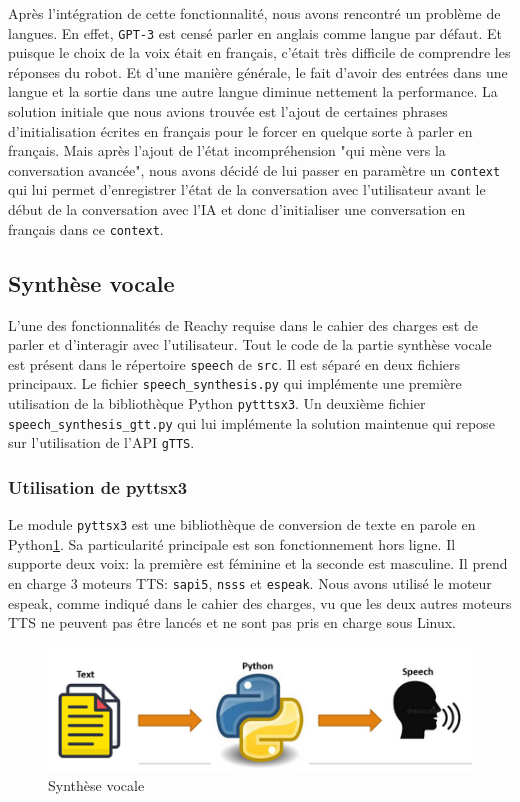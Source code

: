 \documentclass[a4paper,french]{article}
\begin{document}
Après l'intégration de cette fonctionnalité, nous avons rencontré un problème de langues. En effet, \texttt{GPT-3} est censé parler en anglais comme langue par défaut. Et puisque le choix de la voix était en français, c'était très difficile de comprendre les réponses du robot. Et d'une manière générale, le fait d'avoir des entrées dans une langue et la sortie dans une autre langue diminue nettement la performance.
La solution initiale que nous avions trouvée est l'ajout de certaines phrases d'initialisation écrites en français pour le forcer en quelque sorte à parler en français. Mais après l'ajout de l'état incompréhension "qui mène vers la conversation avancée", nous avons décidé de lui passer en paramètre un \texttt{context} qui lui permet d'enregistrer l'état de la conversation avec l'utilisateur avant le début de la conversation avec l'IA et donc d'initialiser une conversation en français dans ce \texttt{context}.


\subsection{Synthèse vocale}
L'une des fonctionnalités de Reachy requise dans le cahier des charges est de parler et d'interagir avec l'utilisateur. Tout le code de la partie synthèse vocale est présent dans le répertoire \texttt{speech} de \texttt{src}. Il est séparé en deux fichiers principaux. Le fichier \texttt{speech\_synthesis.py} qui implémente une première utilisation de la bibliothèque Python \texttt{pytttsx3}. Un deuxième fichier \texttt{speech\_synthesis\_gtt.py} qui lui implémente la solution maintenue qui repose sur l'utilisation de l'API \texttt{gTTS}.

\subsubsection{Utilisation de pyttsx3}
Le module \texttt{pyttsx3} est une bibliothèque de conversion de texte en parole en Python\ref{fig:syntheseVocale}. Sa particularité principale est son fonctionnement hors ligne. Il supporte deux voix: la première est féminine et la seconde est masculine. Il prend en charge 3 moteurs TTS: \texttt{sapi5}, \texttt{nsss} et \texttt{espeak}. Nous avons utilisé le moteur espeak, comme indiqué dans le cahier des charges, vu que les deux autres moteurs TTS ne peuvent pas être lancés et ne sont pas pris en charge sous Linux.\\

\begin{figure}[H]
    \centering
    \includegraphics[scale=0.8]{figures/synthese_vocal.png}
    \caption{Synthèse vocale}
    \label{fig:syntheseVocale}
\end{figure}
\end{document}
